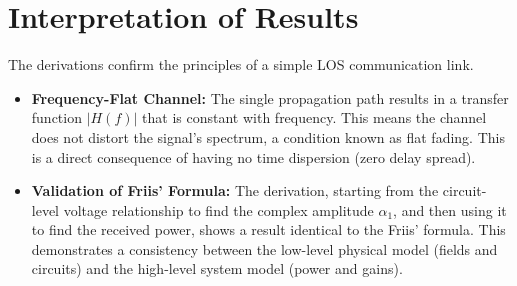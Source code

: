 \section{Interpretation of Results}
The derivations confirm the principles of a simple LOS communication link.
\begin{itemize}
	\item \textbf{Frequency-Flat Channel:} The single propagation path results in a transfer function $|H(f)|$ that is constant with frequency. This means the channel does not distort the signal's spectrum, a condition known as flat fading. This is a direct consequence of having no time dispersion (zero delay spread).
	\item \textbf{Validation of Friis' Formula:} The derivation, starting from the circuit-level voltage relationship to find the complex amplitude $\alpha_1$, and then using it to find the received power, shows a result identical to the Friis' formula. This demonstrates a consistency between the low-level physical model (fields and circuits) and the high-level system model (power and gains).
\end{itemize}
